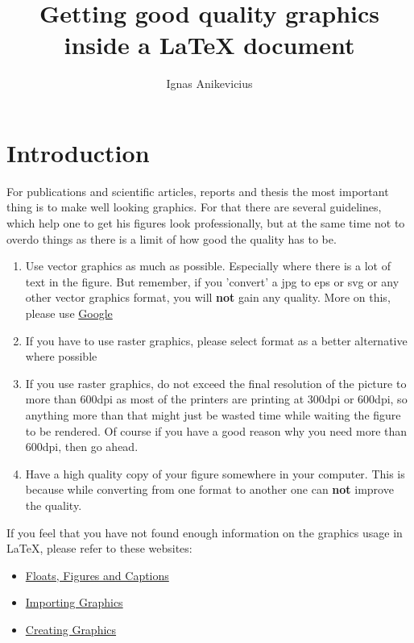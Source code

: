 \documentclass[
]{scrartcl}
\title{Getting good quality graphics inside a \LaTeX{} document}
\author{Ignas Anikevicius}
\begin{document}

\maketitle
\tableofcontents
\listoftodos
\clearpage

\section{Introduction}

%
For publications and scientific articles, reports and thesis the most important
    thing is to make well looking graphics. 
%
For that there are several guidelines, which help one to get his figures look
    professionally, but at the same time not to overdo things as there is a
    limit of how good the quality has to be.

\begin{enumerate}
    \item Use vector graphics as much as possible. Especially where there is a
        lot of text in the figure. But remember, if you 'convert' a jpg to eps
        or svg or any other vector graphics format, you will \textbf{not} gain
        any quality. More on this, please use
        \href{http://www.google.co.uk}{Google}
    \item If you have to use raster graphics, please select  format as
        a better alternative where possible
    \item If you use raster graphics, do not exceed the final resolution of the
        picture to more than 600dpi as most of the printers are printing at
        300dpi or 600dpi, so anything more than that might just be wasted time
        while waiting the figure to be rendered. Of course if you have a good
        reason why you need more than 600dpi, then go ahead.
    \item Have a high quality copy of your figure somewhere in your computer.
        This is because while converting from one format to another one can
        \textbf{not} improve the quality.
\end{enumerate}

If you feel that you have not found enough information on the graphics usage in
\LaTeX, please refer to these websites:
\begin{itemize}
    \item
        \href{https://secure.wikimedia.org/wikibooks/en/wiki/LaTeX/Floats,_Figures_and_Captions}{Floats,
        Figures and Captions}
    \item
        \href{https://secure.wikimedia.org/wikibooks/en/wiki/LaTeX/Importing_Graphics}{Importing
        Graphics}
    \item
        \href{https://secure.wikimedia.org/wikibooks/en/wiki/LaTeX/Creating_Graphics}{Creating
        Graphics}
\end{itemize}
\end{document}
